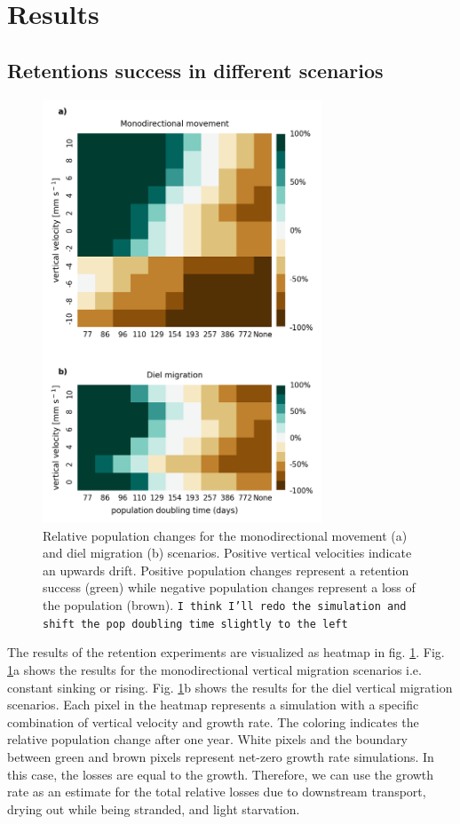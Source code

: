 \documentclass[npg, manuscript]{copernicus}
\begin{document}
\section{Results}

\subsection{Retentions success in different scenarios}

\begin{figure}
    \includegraphics[width=8.3cm]{figures/retention_success_combined.png}
    \caption[]{
        Relative population changes for the monodirectional movement (a) and diel migration (b) scenarios. Positive vertical velocities indicate an upwards drift. Positive population changes represent a retention success (green) while negative population changes represent a loss of the population (brown).
        \texttt{I think I'll redo the simulation and shift the pop doubling time slightly to the left}
        }
    \label{fig:retention_success}
\end{figure}

The results of the retention experiments are visualized as heatmap in fig. \ref{fig:retention_success}.
Fig. \ref{fig:retention_success}a shows the results for the monodirectional vertical migration scenarios i.e. constant sinking or rising. Fig. \ref{fig:retention_success}b shows the results for the diel vertical migration scenarios. Each pixel in the heatmap represents a simulation with a specific combination of vertical velocity and growth rate. The coloring indicates the relative population change after one year. White pixels and the boundary between green and brown pixels represent net-zero growth rate simulations. In this case, the losses are equal to the growth. Therefore, we can use the growth rate as an estimate for the total relative losses due to downstream transport, drying out while being stranded, and light starvation.
\end{document}

